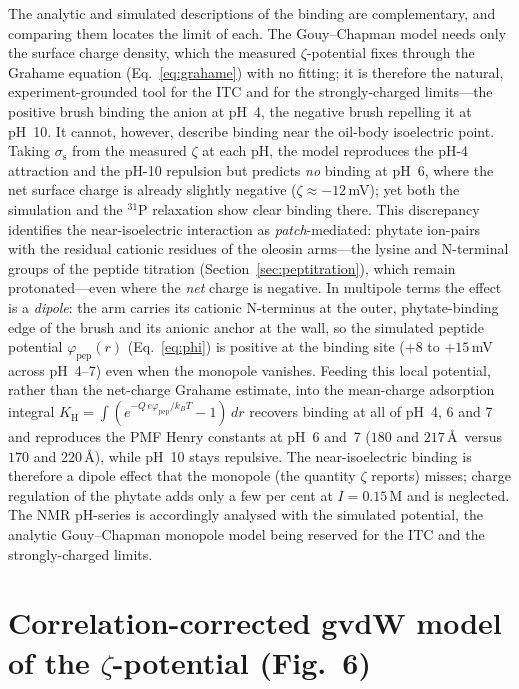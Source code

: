 \documentclass[11pt]{article}
\begin{document}
The analytic and simulated descriptions of the binding are complementary, and
comparing them locates the limit of each.  The Gouy--Chapman model needs only
the surface charge density, which the measured $\zeta$-potential fixes through
the Grahame equation (Eq.~\ref{eq:grahame}) with no fitting; it is therefore the
natural, experiment-grounded tool for the ITC and for the strongly-charged
limits---the positive brush binding the anion at pH~4, the negative brush
repelling it at pH~10.  It cannot, however, describe binding near the oil-body
isoelectric point.  Taking $\sigma_\text{s}$ from the measured $\zeta$ at each
pH, the model reproduces the pH-4 attraction and the pH-10 repulsion but
predicts \emph{no} binding at pH~6, where the net surface charge is already
slightly negative ($\zeta\approx-12$\,mV); yet both the simulation and the
$^{31}$P relaxation show clear binding there.  This discrepancy identifies the
near-isoelectric interaction as \emph{patch}-mediated: phytate ion-pairs with
the residual cationic residues of the oleosin arms---the lysine and N-terminal
groups of the peptide titration (Section~\ref{sec:peptitration}), which remain
protonated---even where the \emph{net} charge is negative.  In multipole terms
the effect is a \emph{dipole}: the arm carries its cationic N-terminus at the
outer, phytate-binding edge of the brush and its anionic anchor at the wall, so
the simulated peptide potential $\varphi_\text{pep}(r)$ (Eq.~\ref{eq:phi}) is
positive at the binding site ($+8$ to $+15$\,mV across pH~4--7) even when the
monopole vanishes.  Feeding this local potential, rather than the net-charge
Grahame estimate, into the mean-charge adsorption integral
$K_\text{H}=\int(e^{-Q\,e\varphi_\text{pep}/k_BT}-1)\,dr$ recovers binding at all
of pH~4, 6 and 7 and reproduces the PMF Henry constants at pH~6 and~7
($180$ and $217$\,\AA\ versus $170$ and $220$\,\AA), while pH~10 stays repulsive.
The near-isoelectric binding is therefore a dipole effect that the monopole
(the quantity $\zeta$ reports) misses; charge regulation of the phytate adds only
a few per cent at $I=0.15$\,M and is neglected.  The NMR pH-series is accordingly
analysed with the simulated potential, the analytic Gouy--Chapman monopole model
being reserved for the ITC and the strongly-charged limits.

\section{Correlation-corrected gvdW model of the \texorpdfstring{$\zeta$}{zeta}-potential (Fig.~6)}
\end{document}
